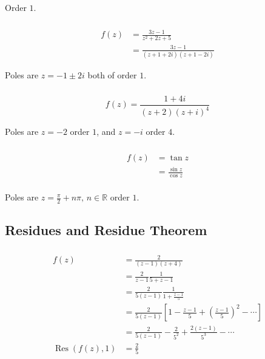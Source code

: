 \documentclass{article}
\newcommand{\Res}{\operatorname{Res}}
\begin{document}
Order $1$.

\setcounter{subsubsection}{12}
\subsubsection{}

\begin{align*}
  f(z) & = \frac{3 z - 1}{z^2 + 2 z + 5}               \\
       & = \frac{3 z - 1}{(z + 1 + 2 i) (z + 1 - 2 i)}
\end{align*}

Poles are $z = -1 \pm 2 i$ both of order $1$.

\setcounter{subsubsection}{14}
\subsubsection{}

\[f(z) = \frac{1 + 4 i}{(z + 2) (z + i)^4}\]

Poles are $z = -2$ order $1$, and $z = -i$ order $4$.

\setcounter{subsubsection}{16}
\subsubsection{}

\begin{align*}
  f(z) & = \tan z                \\
       & = \frac{\sin z}{\cos z} \\
\end{align*}

Poles are $z = \frac{\pi}{2} + n \pi,\, n \in \mathbb{R}$ order $1$.

\subsection{Residues and Residue Theorem}

\subsubsection{}

\begin{align*}
  f(z)          & = \frac{2}{(z - 1) (z + 4)}                                                                          \\
                & = \frac{2}{z - 1} \frac{1}{5 + z - 1}                                                                \\
                & = \frac{2}{5 (z - 1)} \frac{1}{1 + \frac{z - 1}{5}}                                                  \\
                & = \frac{2}{5 (z - 1)} \left[ 1 - \frac{z - 1}{5} + \left( \frac{z - 1}{5} \right)^2 - \cdots \right] \\
                & = \frac{2}{5 (z - 1)} - \frac{2}{5^2} + \frac{2 (z - 1)}{5^3} - \cdots                               \\
  \Res(f(z), 1) & = \frac{2}{5}
\end{align*}
\end{document}
